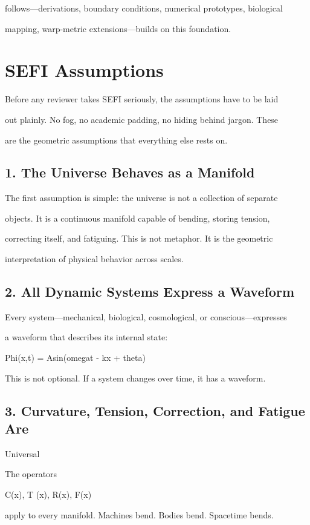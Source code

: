 \documentclass[10pt]{article}
\begin{document}
follows---derivations, boundary conditions, numerical prototypes, biological

mapping, warp-metric extensions---builds on this foundation.

\section*{SEFI Assumptions}
Before any reviewer takes SEFI seriously, the assumptions have to be laid

out plainly. No fog, no academic padding, no hiding behind jargon. These

are the geometric assumptions that everything else rests on.

\subsection*{1. The Universe Behaves as a Manifold}
The first assumption is simple: the universe is not a collection of separate

objects. It is a continuous manifold capable of bending, storing tension,

correcting itself, and fatiguing. This is not metaphor. It is the geometric

interpretation of physical behavior across scales.


\subsection*{2. All Dynamic Systems Express a Waveform}
Every system---mechanical, biological, cosmological, or conscious---expresses

a waveform that describes its internal state:

Phi(x,t) = Asin(omegat - kx + theta)

This is not optional. If a system changes over time, it has a waveform.

\subsection*{3. Curvature, Tension, Correction, and Fatigue Are}
Universal

The operators

C(x), T (x), R(x), F(x)

apply to every manifold. Machines bend. Bodies bend. Spacetime bends.
\end{document}
